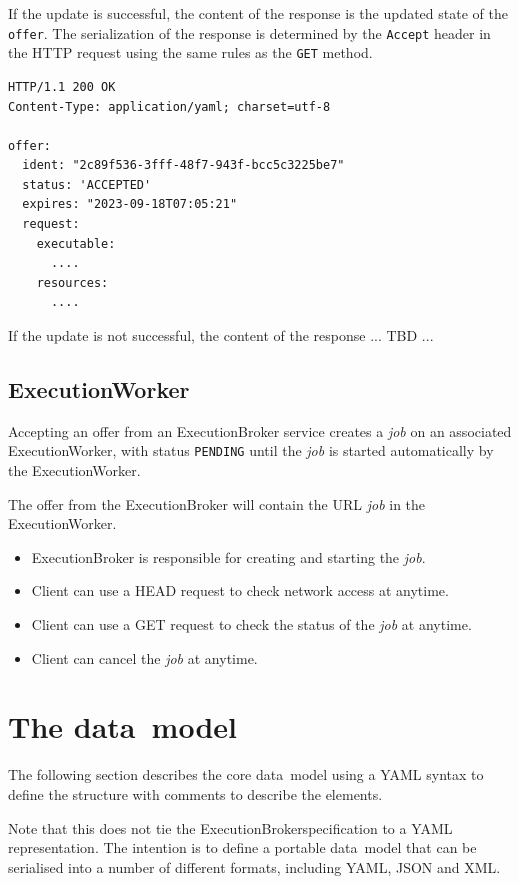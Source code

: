 \documentclass[11pt,a4paper]{ivoa}
\newcommand{\datamodel} {data~model}
\newcommand{\execbrokerclass} {ExecutionBroker}
\newcommand{\execworkerclass} {ExecutionWorker}
\newcommand{\codeword}[1] {\texttt{#1}}
\newcommand{\job} {\textit{job}}
\begin{document}
If the update is successful, the content of the response is the updated state of the \codeword{offer}.
The serialization of the response is determined by the \codeword{Accept} header in the HTTP request
using the same rules as the \codeword{GET} method.

\begin{lstlisting}[]
HTTP/1.1 200 OK
Content-Type: application/yaml; charset=utf-8

offer:
  ident: "2c89f536-3fff-48f7-943f-bcc5c3225be7"
  status: 'ACCEPTED'
  expires: "2023-09-18T07:05:21"
  request:
    executable:
      ....
    resources:
      ....
\end{lstlisting}

If the update is not successful, the content of the response ... TBD ...


\subsection{ExecutionWorker}
\label{execution-worker-spec}

Accepting an offer from an \execbrokerclass{} service creates a \job{} on an associated \execworkerclass{},
with status \codeword{PENDING} until the \job{} is started automatically by the \execworkerclass{}.

The offer from the \execbrokerclass{} will contain the URL \job{} in the \execworkerclass{}.

\begin{itemize}
    \item \execbrokerclass{} is responsible for creating and starting the \job{}.
    \item Client can use a HEAD request to check network access at anytime.
    \item Client can use a GET request to check the status of the \job{} at anytime.
    \item Client can cancel the \job{} at anytime.
\end{itemize}

\pagebreak

\section{The \datamodel{}}
\label{datamodel}

The following section describes the core \datamodel{} using a YAML syntax
to define the structure with comments to describe the elements.

Note that this does not tie the \execbrokerclass specification to a YAML representation.
The intention is to define a portable \datamodel{} that can be serialised
into a number of different formats, including YAML, JSON and XML.
\end{document}
